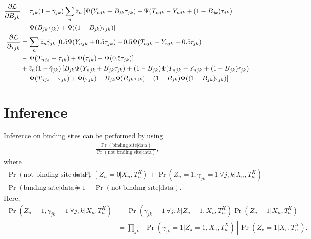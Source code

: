 \documentclass[reqno]{amsart}
\numberwithin{equation}{section}
\begin{document}
\begin{align}
    \frac{\partial \mathcal{L}}{\partial B_{jk}}
        &= \tau_{jk} (1-\tilde{\gamma}_{jk}) \sum_n \tilde{z}_n \left[ \Psi(Y_{njk}+B_{jk}\tau_{jk})
        - \Psi(T_{njk}-Y_{njk}+(1-B_{jk})\tau_{jk}) \right. \notag\\
        &- \left. \Psi(B_{jk}\tau_{jk}) + \Psi((1-B_{jk})\tau_{jk}) \right] \\
    \frac{\partial \mathcal{L}}{\partial \tau_{jk}}
        &= \sum_n \tilde{z}_n \tilde{\gamma}_{jk} \left[ 0.5 \Psi(Y_{njk}+0.5\tau_{jk}) + 0.5 \Psi(T_{njk}-Y_{njk}+0.5\tau_{jk}) \right. \notag\\
        &- \left. \Psi(T_{njk}+\tau_{jk}) + \Psi(\tau_{jk}) - \Psi(0.5\tau_{jk}) \right] \notag\\
        &+ \tilde{z}_n (1-\tilde{\gamma}_{jk}) \left[ B_{jk} \Psi(Y_{njk}+B_{jk}\tau_{jk})
        + (1-B_{jk}) \Psi(T_{njk}-Y_{njk}+(1-B_{jk})\tau_{jk}) \right. \notag\\
        &- \left. \Psi(T_{njk}+\tau_{jk}) + \Psi(\tau_{jk})
        - B_{jk} \Psi(B_{jk}\tau_{jk}) - (1-B_{jk}) \Psi((1-B_{jk})\tau_{jk}) \right]
\end{align}

\section{Inference}
Inference on binding sites can be performed by using
\begin{align}
	\frac{\Pr(\text{binding site} | \text{data})}{\Pr(\text{not binding site} | \text{data})},
\end{align}
where
\begin{align}
	\Pr(\text{not binding site} | \text{data})
	 &= \Pr(Z_n = 0 | X_n, T^X_n) + \Pr(Z_n = 1, \gamma_{jk} = 1 \  \forall j,k  | X_n, T^X_n)\\
	\Pr(\text{binding site} | \text{data})
	&= 1- \Pr(\text{not binding site} | \text{data}).
\end{align}
Here, 
\begin{align}
	\Pr(Z_n = 1, \gamma_{jk} = 1 \  \forall j,k  | X_n, T^X_n)
	 &= \Pr(\gamma_{jk} = 1 \  \forall j,k  | Z_n = 1, X_n, T^X_n)\Pr(Z_n = 1 | X_n, T^X_n)\\
	 &= \prod_{jk}[\Pr(\gamma_{jk} = 1 | Z_n = 1, X_n, T^X_n)]\Pr(Z_n = 1 | X_n, T^X_n).
\end{align}

 
\end{document}
